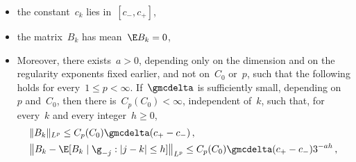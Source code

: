 \documentclass[11pt]{amsart}
\begin{document}
\begin{proposition}
\label{mfd:prop-conc}
\begin{itemize}
\item the constant~$c_k$ lies in~$[c_-,c_+]$,
\item the matrix~$B_k$ has mean~$\E B_k=0$,
\item Moreover, there exists~$a>0$, depending only on the dimension and on the regularity exponents fixed earlier, and not on~$C_0$ or~$p$, such that the following holds for every~$1\leq p<\infty$. If~$\gmcdelta$ is sufficiently small, depending on~$p$ and~$C_0$, then there is~$C_p(C_0)<\infty$, independent of~$k$, such that, for every~$k$ and every integer~$h\geq0$,
\begin{equation}
	\begin{aligned}
		&\|B_k\|_{L^p}\leq C_p(C_0)\gmcdelta(c_+-c_-)\,,\\
		&\bigl\|B_k-\E[B_k\mid\g_{-j}:|j-k|\leq h]\bigr\|_{L^p}\leq C_p(C_0)\gmcdelta(c_+-c_-)3^{-a h}\,,
	\end{aligned}
	\label{eq:mfd-31}
\end{equation}
\end{itemize}
\end{proposition}
\end{document}
